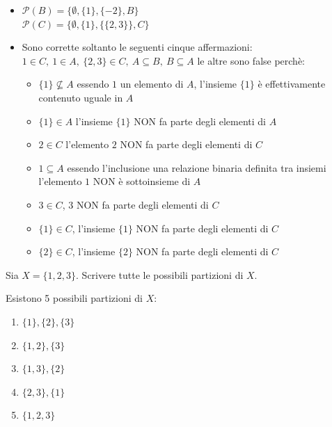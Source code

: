 \begin{soluzione}
\begin{itemize}
    \item $\mathcal{P}(B)=\{\emptyset, \{1\}, \{-2\}, B\}$\\
    $\mathcal{P}(C)=\{\emptyset, \{1\}, \{\{2,3\}\}, C \}$
    \item Sono corrette soltanto le seguenti cinque affermazioni: $1\in C,\ 1\in A,\ \{2, 3\}\in C,\ A\subseteq B,\ B\subseteq A $ le altre sono false perchè:
    \begin{itemize}
        \item $\{1\}\not\subseteq A $ essendo $1$ un elemento di $A$, l'insieme $\{1\}$ è effettivamente contenuto uguale in $A$
        \item $\{1\}\in A$ l'insieme $\{1\}$ NON fa parte degli elementi di $A$
        \item $2\in C$ l'elemento $2$ NON fa parte degli elementi di $C$
        \item $1\subseteq A$ essendo l'inclusione una relazione binaria definita tra insiemi l'elemento $1$ NON è sottoinsieme di $A$
        \item $3\in C$, $3$ NON fa parte degli elementi di $C$
        \item $\{1\}\in C$, l'insieme $\{1\}$ NON fa parte degli elementi di $C$
        \item $\{2\}\in C$, l'insieme $\{2\}$ NON fa parte degli elementi di $C$
    \end{itemize}
\end{itemize}
\end{soluzione}


\begin{esercizio}
Sia $X = \{ 1,2,3 \}$. Scrivere tutte le possibili partizioni di $X$. 
\end{esercizio}

\begin{soluzione}
Esistono 5 possibili partizioni di $X$: 
\begin{enumerate}
    \item $\{1 \}, \{ 2 \}, \{ 3 \}$
    \item $\{1,2 \}, \{3 \}$
    \item $\{1,3 \}, \{ 2 \}$
    \item $\{ 2,3 \}, \{ 1 \}$
    \item $\{ 1,2,3 \}$
\end{enumerate}
\end{soluzione}

